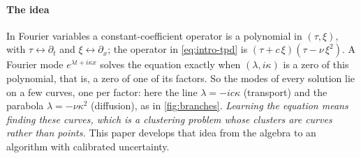 \documentclass[11pt]{article}
\theoremstyle{plain}
\theoremstyle{definition}
\theoremstyle{remark}
\begin{document}
\paragraph{The idea} In Fourier variables a constant-coefficient operator is a polynomial in $(\tau,\xi)$, with
$\tau\leftrightarrow\partial_t$ and $\xi\leftrightarrow\partial_x$; the operator in \eqref{eq:intro-tpd} is
$(\tau+c\,\xi)(\tau-\nu\,\xi^2)$. A Fourier mode $e^{\lambda t+i\kappa x}$ solves the equation exactly when $(\lambda,i\kappa)$
is a zero of this polynomial, that is, a zero of one of its factors. So the modes of every solution lie on a few curves,
one per factor: here the line $\lambda=-ic\kappa$ (transport) and the parabola $\lambda=-\nu\kappa^2$ (diffusion), as in
\cref{fig:branches}. \emph{Learning the equation means finding these curves, which is a clustering problem whose
clusters are curves rather than points.} This paper develops that idea from the algebra to an algorithm with calibrated
uncertainty.
\end{document}
